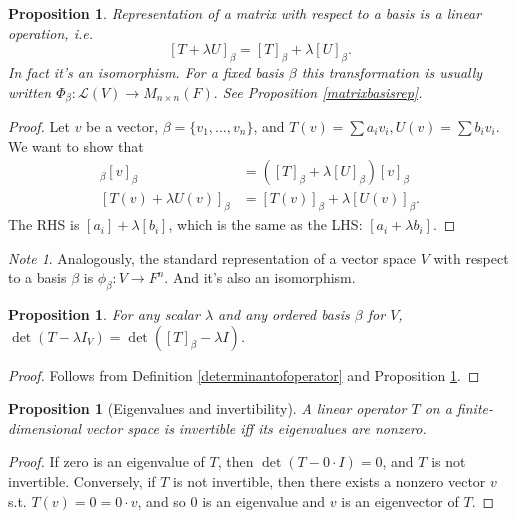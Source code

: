 \documentclass[12pt]{article}
\theoremstyle{plain}
\newtheorem{proposition}[theorem]{Proposition}
\theoremstyle{definition}
\theoremstyle{remark}
\newtheorem{note}[theorem]{Note}
\begin{document}
\begin{proposition}\label{changeofbasislinear}
Representation of a matrix with respect to a basis is a linear operation, i.e. $$[T + \lambda U]_\beta = [T]_\beta + \lambda[U]_\beta.$$ In fact it's an isomorphism. For a fixed basis $\beta$ this transformation is usually written $\Phi_\beta: \mathcal{L}(V) \longrightarrow M_{n\times n}(F).$ See Proposition \ref{matrixbasisrep}.
\end{proposition}

\begin{proof}
Let $v$ be a vector, $\beta = \{v_1,\ldots, v_n\}$, and $T(v) = \sum a_i v_i, U(v) = \sum b_i v_i$. We want to show that
\begin{align*}
[T + \lambda U]_\beta [v]_\beta &= ([T]_\beta + \lambda[U]_\beta)[v]_\beta \\
[T(v) + \lambda U(v)]_\beta &= [T(v)]_\beta + \lambda[U(v)]_\beta.
\end{align*}
The RHS is $[a_i] + \lambda [b_i]$, which is the same as the LHS: $[a_i + \lambda b_i]$.
\end{proof}

\begin{note}
Analogously, the standard representation of a vector space $V$ with respect to a basis $\beta$ is $\phi_\beta: V \longrightarrow F^n.$ And it's also an isomorphism.
\end{note}

\begin{proposition}
For any scalar $\lambda$ and any ordered basis $\beta$ for $V$, $\det(T - \lambda I_V) = \det([T]_\beta - \lambda I)$.
\end{proposition}

\begin{proof}
Follows from Definition \ref{determinantofoperator} and Proposition \ref{changeofbasislinear}.
\end{proof}

\begin{mdframed}
\begin{proposition}[Eigenvalues and invertibility]
A linear operator $T$ on a finite-dimensional vector space is invertible iff its eigenvalues are nonzero.
\end{proposition}
\end{mdframed}

\begin{proof}
If zero is an eigenvalue of $T$, then $\det(T - 0 \cdot I) = 0$, and $T$ is not invertible. Conversely, if $T$ is not invertible, then there exists a nonzero vector $v$ s.t. $T(v) = 0 = 0 \cdot v$, and so 0 is an eigenvalue and $v$ is an eigenvector of $T$.
\end{proof}
\end{document}

